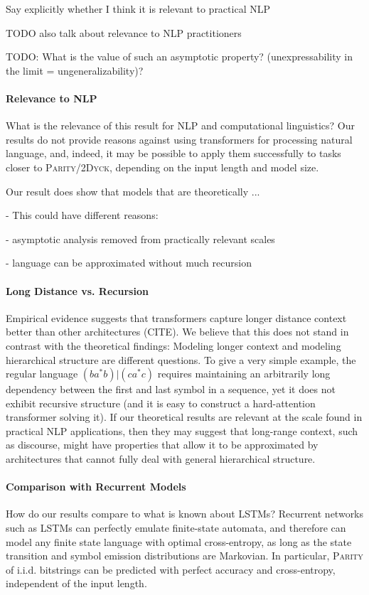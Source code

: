 \documentclass[11pt,a4paper]{article}
\begin{document}
Say explicitly whether I think it is relevant to practical NLP

TODO also talk about relevance to NLP practitioners

TODO: What is the value of such an asymptotic property? (unexpressability in the limit = ungeneralizability)?

\paragraph{Relevance to NLP}
What is the relevance of this result for NLP and computational linguistics?
Our results do not provide reasons against using transformers for processing natural language, and, indeed, it may be possible to apply them successfully to tasks closer to \textsc{Parity}/\textsc{2Dyck}, depending on the input length and model size.

Our result does show that models that are theoretically ...

- This could have different reasons:

- asymptotic analysis removed from practically relevant scales

- language can be approximated without much recursion

\paragraph{Long Distance vs. Recursion}
Empirical evidence suggests that transformers capture longer distance context better than other architectures (CITE).
We believe that this does not stand in contrast with the theoretical findings:
Modeling longer context and modeling hierarchical structure are different questions.
To give a very simple example, the regular language $(ba^*b)|(ca^*c)$ requires maintaining an arbitrarily long dependency between the first and last symbol in a sequence, yet it does not exhibit recursive structure (and it is easy to construct a hard-attention transformer solving it).
If our theoretical results are relevant at the scale found in practical NLP applications, then they may suggest that long-range context, such as discourse, might have properties that allow it to be approximated by architectures that cannot fully deal with general hierarchical structure.

\paragraph{Comparison with Recurrent Models}
How do our results compare to what is known about LSTMs?
Recurrent networks such as LSTMs can perfectly emulate finite-state automata, and therefore can model any finite state language with optimal cross-entropy, as long as the state transition and symbol emission distributions are Markovian.
In particular, \textsc{Parity} of i.i.d. bitstrings can be predicted with perfect accuracy and cross-entropy, independent of the input length.
\end{document}
